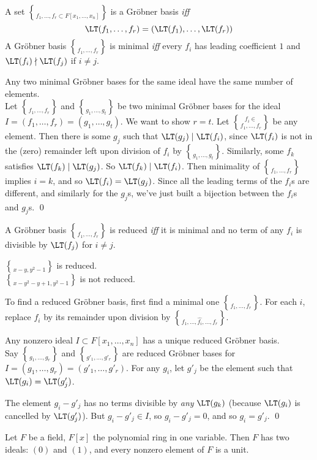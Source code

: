  A set $\brace{f_1,\dotsc,f_r}\subset F[x_1,\dotsc,x_n]$ is a Gr\"obner basis \emph{iff}
\[ \LT(f_1,\dotsc,f_r) = (\LT(f_1),\dotsc,\LT(f_r)) \]
 A Gr\"obner basis $\brace{f_1,\dotsc,f_r}$ is minimal \emph{iff} every $f_i$ has leading coefficient $1$ and $\LT(f_i)\nmid\LT(f_j)$ if $i\neq j$.

\thm Any two minimal Gr\"obner bases for the same ideal have the same number of elements. \\
\pf Let $\brace{f_1,\dotsc,f_r}$ and $\brace{g_1,\dotsc,g_t}$ be two minimal Gr\"obner bases for the ideal $I=(f_1,\dotsc,f_r)=(g_1,\dotsc,g_t)$.  We want to show $r=t$.  Let $f_i\in\brace{f_1,\dotsc,f_r}$ be any element.  Then there is some $g_j$ such that $\LT(g_j)\mid\LT(f_i)$, since $\LT(f_i)$ is not in the (zero) remainder left upon division of $f_i$ by $\brace{g_1,\dotsc,g_t}$.  Similarly, some $f_k$ satisfies $\LT(f_k)\mid\LT(g_j)$.
So $\LT(f_k)\mid\LT(f_i)$.  Then minimality of $\brace{f_1,\dotsc,f_r}$ implies $i=k$, and so $\LT(f_i)=\LT(g_j)$.  Since all the leading terms of the $f_i$s are different, and similarly for the $g_j$s, we've just built a bijection between the $f_i$s and $g_j$s. \qed

 A Gr\"obner basis $\brace{f_1,\dotsc,f_r}$ is reduced \emph{iff} it is minimal and no term of any $f_i$ is divisible by $\LT(f_j)$ for $i\neq j$.

\eg $\brace{x-y,y^2-1}$ is reduced. \\
$\brace{x-y^2-y+1,y^2-1}$ is not reduced.

To find a reduced Gr\"obner basis, first find a minimal one $\brace{f_1,\dotsc,f_r}$.  For each $i$, replace $f_i$ by its remainder upon division by $\brace{f_1,\dotsc,\hat{f_i},\dotsc,f_r}$.

\thm Any nonzero ideal $I\subset F[x_1,\dotsc,x_n]$ has a unique reduced Gr\"obner basis. \\
\pf Say $\brace{g_1,\dotsc,g_r}$ and $\brace{g'_1,\dotsc,g'_r}$ are reduced Gr\"obner bases for $I=(g_1,\dotsc,g_r)=(g'_1,\dotsc,g'_r)$.  For any $g_i$, let $g'_j$ be the element such that $\LT(g_i)=\LT(g'_j)$.

The element $g_i-g'_j$ has no terms divisible by \emph{any} $\LT(g_k)$ (because $\LT(g_i)$ is cancelled by $\LT(g'_j)$).  But $g_i-g'_j\in I$, so $g_i-g'_j=0$, and so $g_i=g'_j$. \qed

Let $F$ be a field, $F[x]$ the polynomial ring in one variable.  Then $F$ has two ideals: $(0)$ and $(1)$, and every nonzero element of $F$ is a unit.


